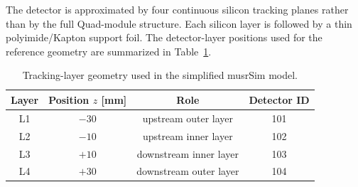 \documentclass[11pt,a4paper]{article}
\begin{document}
The detector is approximated by four continuous silicon tracking planes rather
than by the full Quad-module structure. Each silicon layer is followed by a thin
polyimide/Kapton support foil. The detector-layer positions used for the
reference geometry are summarized in Table~\ref{tab:layers}.

\begin{table}[ht]
\centering
\caption{Tracking-layer geometry used in the simplified musrSim model.}
\label{tab:layers}
\begin{tabular}{cccc}
\toprule
Layer & Position $z$ [mm] & Role & Detector ID \\
\midrule
L1 & $-30$ & upstream outer layer & 101 \\
L2 & $-10$ & upstream inner layer & 102 \\
L3 & $+10$ & downstream inner layer & 103 \\
L4 & $+30$ & downstream outer layer & 104 \\
\bottomrule
\end{tabular}
\end{table}
\end{document}
